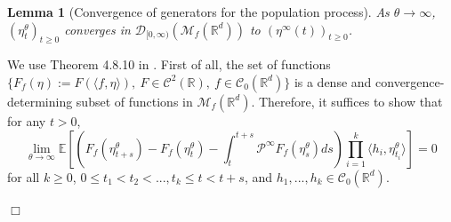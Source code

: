 \documentclass[12pt]{article}
\newenvironment {proof}{{\noindent\bf Proof }}{\hfill $\Box$ \medskip}
\newtheorem{lemma}[theorem]{Lemma}
\newcommand{\Pgen}{\mathcal{P}}    %
\begin{document}
\begin{lemma}[Convergence of generators for the population process]
As $\theta \to \infty$,
$(\eta^{\theta}_t)_{t \geq 0}$ converges in $\mathcal{D}_{[0,\infty)}(\mathcal{M}_f(\mathbb{R}^d))$
to $(\eta^{\infty}(t))_{t \geq 0}$.
\end{lemma}
\begin{proof}
We use Theorem 4.8.10 in \cite{EK}.
First of all, the set of functions
$\{F_f(\eta):= F(\langle f, \eta \rangle ),~
F \in \mathcal{C}^{2}(\mathbb{R}), ~
f \in \mathcal{C}_{0}(\mathbb{R}^d)\}$
is a dense and convergence-determining 
subset of functions in $\mathcal{M}_f(\mathbb{R}^d)$.
Therefore, it suffices to show that for any $t>0$,
\begin{equation}
    \label{eq: Convergence Condition}
\lim_{\theta \to \infty}
\mathbb{E}\left[
\left(
F_f(\eta^{\theta}_{t+s})-F_f(\eta^{\theta}_t)
-\int_{t}^{t+s}\Pgen^{\infty}F_f(\eta^{\theta}_s)ds
\right)
\prod_{i=1}^{k}\langle h_i,\eta^{\theta}_{t_i} \rangle
\right]=0
\end{equation}
for all $k\geq 0$, $0\leq t_1<t_2<...,t_k \leq t < t+s$,
and $h_1,...,h_k \in \mathcal{C}_{0}(\mathbb{R}^d)$.


\end{proof}
\end{document}

